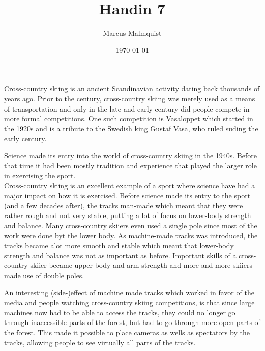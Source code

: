 \documentclass[12pt,a4paper]{IEEEtran}
\title{Handin 7}
\author{Marcus Malmquist}
\date{\today}
\begin{document}
\maketitle
\noindent Cross-country skiing is an ancient Scandinavian activity dating back thousands of years ago.
Prior to the  century, cross-country skiing was merely used as a means of transportation and only in the late  and early  century did people compete in more formal competitions.
One such competition is Vasaloppet which started in the 1920s and is a tribute to the Swedish king Gustaf Vasa, who ruled suding the early  century.

Science made its entry into the world of cross-country skiing in the 1940s.
Before that time it had been mostly tradition and experience that played the larger role in exercising the sport.\\

\noindent Cross-country skiing is an excellent example of a sport where science have had a major impact on how it is exercised.
Before science made its entry to the sport (and a few decades after), the tracks man-made which meant that they were rather rough and not very stable, putting a lot of focus on lower-body strength and balance.
Many cross-country skiiers even used a single pole since most of the work were done byt the lower body.
As machine-made tracks was introduced, the tracks became alot more smooth and stable which meant that lower-body strength and balance was not as important as before.
Important skills of a cross-country skiier became upper-body and arm-strength and more and more skiiers made use of double poles.

An interesting (side-)effect of machine made tracks which worked in favor of the media and people watching cross-country skiing competitions, is that since large machines now had to be able to access the tracks, they could no longer go through inaccessible parts of the forest, but had to go through more open parts of the forest.
This made it possible to place cameras as wells as spectators by the tracks, allowing people to see virtually all parts of the tracks.
\end{document}
